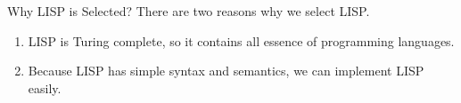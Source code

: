 \documentclass[pdftex,10pt,c,compress]{beamer}
\begin{document}
  \begin{frame}{Why LISP is Selected?}
    There are two reasons why we select LISP.
      \begin{enumerate}
      \item LISP is Turing complete, so it contains all essence of
             programming languages.
      \item Because LISP has simple syntax and semantics, we can
             implement LISP easily.
    \end{enumerate}
  \end{frame}
\end{document}
